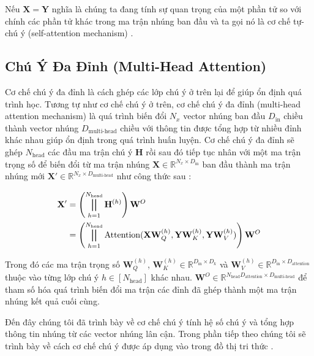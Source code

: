 Nếu $\mathbf{X} = \mathbf{Y}$ nghĩa là chúng ta đang tính sự quan trọng của một phần tử so với chính các phần tử khác trong ma trận nhúng ban đầu và ta gọi nó là cơ chế tự-chú ý (self-attention mechanism) .

\subsection{Chú Ý Đa Đỉnh (Multi-Head Attention)}

Cơ chế chú ý đa đỉnh là cách ghép các lớp chú ý ở trên lại để giúp ổn định quá trình học.
Tương tự như cơ chế chú ý ở trên, cơ chế chú ý đa đỉnh (multi-head attention mechanism) là quá trình biến đổi $N_x$ vector nhúng ban đầu $D_{\text{in}}$ chiều thành vector nhúng $D_{\text{multi-head}}$ chiều với thông tin được tổng hợp từ nhiều đỉnh khác nhau giúp ổn định trong quá trình huấn luyện. Cơ chế chú ý đa đỉnh sẽ ghép $N_{\text{head}}$ các đầu ma trận chú ý $\mathbf{H}$ rồi sau đó tiếp tục nhân với một ma trận trọng số để biến đổi từ ma trận nhúng $\mathbf{X} \in \mathbb{R}^{N_x \times D_\text{in}}$ ban đầu thành ma trận nhúng mới $\mathbf{X}' \in \mathbb{R}^{N_x \times D_{\text{multi-head}}}$ như công thức sau :

\begin{equation}
	\label{headAttention}
	\begin{split}
		\mathbf{X}'& =\left(\bigparallel_{h=1}^{N_{\text{head}}}\mathbf{H}^{(h)}\right)\mathbf{W}^{O} \\
		& = \left(\bigparallel_{h=1}^{N_{\text{head}}} \text{Attention}(\mathbf{X} \mathbf{W}_Q^{(h)}, \mathbf{Y} \mathbf{W}_K^{(h)}, \mathbf{Y} \mathbf{W}_V^{(h)}) \right)\mathbf{W}^{O}
	\end{split}
\end{equation}

Trong đó các ma trận trọng số $\mathbf{W}_Q^{(h)}$, $\mathbf{W}_K^{(h)} \in \mathbb{R}^{D_{\text{in}} \times D_{k}}$ và $\mathbf{W}_V^{(h)} \in \mathbb{R}^{D_{\text{in}} \times D_{\text{attention}}}$ thuộc vào từng lớp chú ý $h \in [N_{\text{head}}]$ khác nhau. $\mathbf{W}^{O} \in \mathbb{R}^{N_{\text{head}} D_{\text{attention}} \times D_{\text{multi-head}}}$ để tham số hóa quá trình biến đổi ma trận các đỉnh đã ghép thành một ma trận nhúng kết quả cuối cùng.

Đến đây chúng tôi đã trình bày về cơ chế chú ý tính hệ số chú ý và tổng hợp thông tin nhúng từ các vector nhúng lân cận. Trong phần tiếp theo chúng tôi sẽ trình bày về cách cơ chế chú ý được áp dụng vào trong đồ thị tri thức .

